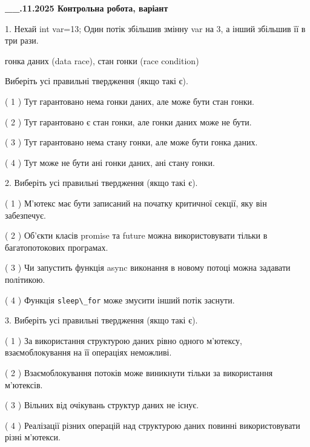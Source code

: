 \documentclass[12pt, ukrainian]{article}
\def\code#1{\Verb!#1!}
\begin{document}
\newpage
\begin {large}

\textbf{\_\_.11.2025 Контрольна робота, варіант  }\par


{
1. Нехай int var=13; Один потік збільшив змінну var на 3, а інший збільшив її в три рази.

гонка даних (data race), стан гонки (race condition)

Виберіть усі правильні твердження (якщо такі є).\par
\vspace{2mm}
( 1 ) Тут гарантовано нема гонки даних, але може бути стан гонки.%

( 2 ) Тут гарантовано є стан гонки, але гонки даних може не бути.%

( 3 ) Тут гарантовано нема стану гонки, але може бути гонка даних.%

( 4 ) Тут може не бути ані гонки даних, ані стану гонки.%


2. Виберіть усі правильні твердження (якщо такі є).\par
\vspace{2mm}

( 1 ) М’ютекс має бути записаний на початку критичної секції, яку він забезпечує.%

( 2 ) Об’єкти класів promise та future можна використовувати тільки в багатопотокових програмах.%

( 3 ) Чи запустить функція  async виконання в новому потоці можна задавати політикою.%

( 4 ) Функція \code{sleep\_for} може змусити інший потік заснути.%


3. Виберіть усі правильні твердження (якщо такі є).\par
\vspace{2mm}

( 1 ) За використання структурою даних рівно одного м’ютексу, взаємоблокування на її операціях неможливі.%

( 2 ) Взаємоблокування потоків може виникнути тільки за використання м’ютексів.%

( 3 ) Вільних від очікувань структур даних не існує.%

( 4 ) Реалізації різних операцій над структурою даних повинні використовувати різні м’ютекси.%


}
\end{large}
\end{document}
